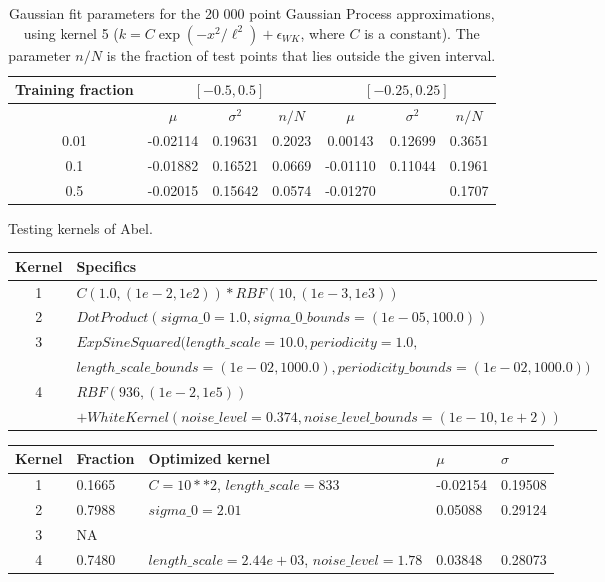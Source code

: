 \documentclass[twoside,english]{uiofysmaster}
\begin{document}
\begin{table}
\centering
\begin{tabular}{ccccccc}
\toprule
Training fraction &  \multicolumn{3}{c}{$[-0.5, 0.5]$} & \multicolumn{3}{c}{$[-0.25,0.25]$}\\
\midrule
{}  & $\mu$ & $\sigma^2$ & $n/N$ & $\mu$ & $\sigma^2$ & $n/N$\\
0.01 & -0.02114 & 0.19631 & 0.2023 & 0.00143 & 0.12699 & 0.3651\\
0.1 & -0.01882 & 0.16521 & 0.0669 & -0.01110 & 0.11044 & 0.1961\\
0.5 & -0.02015 & 0.15642 & 0.0574 & -0.01270 & \color{red}{0.10524} & 0.1707\\
\bottomrule
\end{tabular}
\caption{Gaussian fit parameters for the 20 000 point Gaussian Process approximations, using kernel 5 ($k = C \exp (-x^2/\ell^2) + \epsilon_{WK}$, where $C$ is a constant). The parameter $n/N$ is the fraction of test points that lies outside the given interval.}
\label{Tab:: GP 20k comparison of training fractions k5}
\end{table}



\pagebreak

Testing kernels of Abel.



\begin{table}[H]
\centering
\begin{tabular}{|c|l|}
\hline
Kernel & Specifics\\
\hline
1 & $C(1.0, (1e-2, 1e2)) * RBF(10, (1e-3, 1e3))$\\
\hline
2 & $DotProduct(sigma\_0=1.0, sigma\_0\_bounds=(1e-05, 100.0))$\\
\hline
3 & $ExpSineSquared(length\_scale=10.0, periodicity=1.0,$\\
&$ length\_scale\_bounds=(1e-02, 1000.0), periodicity\_bounds=(1e-02, 1000.0))$\\
\hline
4 & $RBF(936, (1e-2, 1e5))$\\
&$ + WhiteKernel(noise\_level=0.374, noise\_level\_bounds=(1e-10, 1e+2))$\\
\hline
\end{tabular}
\end{table}

\begin{table}[H]
\begin{tabular}{|c|l|l|l|l|}
\hline
Kernel & Fraction & Optimized kernel & $\mu$ & $\sigma$\\
\hline
1 & 0.1665 & $C = 10**2$, $length\_scale=833$ & -0.02154 & 0.19508\\
2 & 0.7988 & $sigma\_0=2.01$ & 0.05088 & 0.29124\\
3 & NA\\
4 & 0.7480 & $length\_scale=2.44e+03$, $ noise\_level=1.78$ & 0.03848 & 0.28073\\
\hline
\end{tabular}
\end{table}
\end{document}
